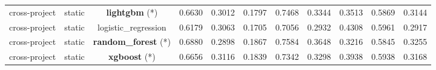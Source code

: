 \begin{table}[t]
\begin{tabular}{ccccccccccc}
cross-project & static & \textbf{lightgbm} (*) & 0.6630 & 0.3012 & 0.1797 & 0.7468 & 0.3344 & 0.3513 & 0.5869 & 0.3144 \\
cross-project & static & logistic_regression & 0.6179 & 0.3063 & 0.1705 & 0.7056 & 0.2932 & 0.4308 & 0.5961 & 0.2917 \\
cross-project & static & \textbf{random_forest} (*) & 0.6880 & 0.2898 & 0.1867 & 0.7584 & 0.3648 & 0.3216 & 0.5845 & 0.3255 \\
cross-project & static & \textbf{xgboost} (*) & 0.6656 & 0.3116 & 0.1839 & 0.7342 & 0.3298 & 0.3938 & 0.5938 & 0.3168 \\
\bottomrule
\end{tabular}
\end{table}